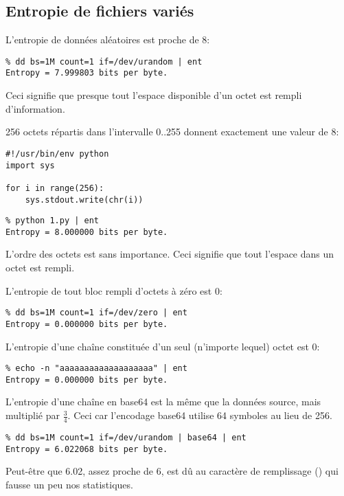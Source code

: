 \subsection{Entropie de fichiers variés}

L'entropie de données aléatoires est proche de 8:

\begin{lstlisting}
% dd bs=1M count=1 if=/dev/urandom | ent
Entropy = 7.999803 bits per byte.
\end{lstlisting}

Ceci signifie que presque tout l'espace disponible d'un octet est rempli d'information.

256 octets répartis dans l'intervalle 0..255 donnent exactement une valeur de 8:

\begin{lstlisting}[style=custompy]
#!/usr/bin/env python
import sys

for i in range(256):
    sys.stdout.write(chr(i))
\end{lstlisting}

\begin{lstlisting}
% python 1.py | ent
Entropy = 8.000000 bits per byte.
\end{lstlisting}

L'ordre des octets est sans importance.
Ceci signifie que tout l'espace dans un octet est rempli.

L'entropie de tout bloc rempli d'octets à zéro est 0:

\begin{lstlisting}
% dd bs=1M count=1 if=/dev/zero | ent
Entropy = 0.000000 bits per byte.
\end{lstlisting}

L'entropie d'une chaîne constituée d'un seul (n'importe lequel) octet est 0:

\begin{lstlisting}
% echo -n "aaaaaaaaaaaaaaaaaaa" | ent
Entropy = 0.000000 bits per byte.
\end{lstlisting}

L'entropie d'une chaîne en base64 est la même que la données source, mais multiplié
par $\frac{3}{4}$.
Ceci car l'encodage base64 utilise 64 symboles au lieu de 256.

\begin{lstlisting}
% dd bs=1M count=1 if=/dev/urandom | base64 | ent
Entropy = 6.022068 bits per byte.
\end{lstlisting}

Peut-être que 6.02, assez proche de 6, est dû au caractère de remplissage (\TT{=}) qui
fausse un peu nos statistiques.

